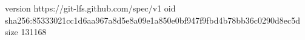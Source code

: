 version https://git-lfs.github.com/spec/v1
oid sha256:85333021cc1d6aa967a8d5e8a09e1a850e0bf947f9fbd4b78bb36c0290d8ec5d
size 131168
